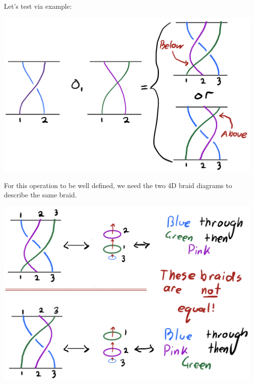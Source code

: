 \documentclass[14pt, xcolor=svgnames]{beamer}
\begin{document}
\begin{frame}
    Let's test via example: 
    \vfill
    \begin{center}
    \includegraphics[width = \textwidth]{images/proof by picture.png}
    \end{center}
    For this operation to be well defined, we need the two 4D braid diagrams to describe the same braid. 
    
\end{frame}
    
\begin{frame}
    \begin{center}
    \includegraphics[width = \textwidth]{images/contradiction by picture.png}
    \end{center}
\end{frame}
\end{document}
